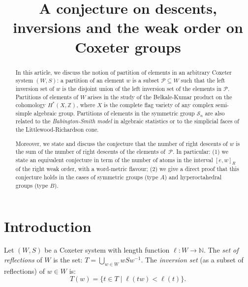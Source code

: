 \documentclass[ALCO,Unicode]{cedram}
\author[C. Hohlweg]{\firstname{Christophe} \lastname{Hohlweg}}
\author[V. Pons]{\firstname{Viviane} \lastname{Pons}}
\title[A conjecture on descents, inversions and the weak order]{A conjecture on descents, inversions and the weak order on Coxeter groups}
\theoremstyle{definition}
\begin{document}



\begin{abstract} In this article, we discuss the notion of partition of elements in an arbitrary Coxeter system $(W,S)$: a partition of an element $w$ is a subset $\mathcal P\subseteq W$ such that the left inversion set of $w$ is the disjoint union of the left inversion set of the elements in $\mathcal P$. Partitions of elements of $W$ arises in the study of the Belkale-Kumar product on the cohomology $H^*(X,\mathbb Z)$, where $X$ is  the complete flag variety of any complex semi-simple algebraic group. Partitions of elements in the symmetric group $\mathcal S_n$ are also related to the {\em Babington-Smith model} in algebraic statistics or to the simplicial faces of the Littlewood-Richardson cone. 

Moreover, we state and discuss the conjecture that the number of right descents of $w$ is the  sum of the number of right descents of the elements of~$\mathcal P$. In particular: (1) we state an equivalent conjecture in term of the number of atoms  in the interval $[e,w]_R$ of the right weak order, with a word-metric flavour; (2) we give a direct proof that this conjecture holds in the cases of symmetric groups (type $A$) and hyperoctahedral groups (type $B$). 
\end{abstract}

\maketitle


\section{Introduction}   Let $(W,S)$ be a Coxeter system with length function $\ell:W\to \mathbb N$. The {\em set of reflections} of $W$ is the set:
$
T=\bigcup_{w\in W}wSw^{-1}.
$
 The {\em inversion set} (as a subset of reflections) of $w\in W$ is:
 $$
 T(w) = \{t \in T\mid \ell(tw)<\ell(t)\}.
 $$
\end{document}
